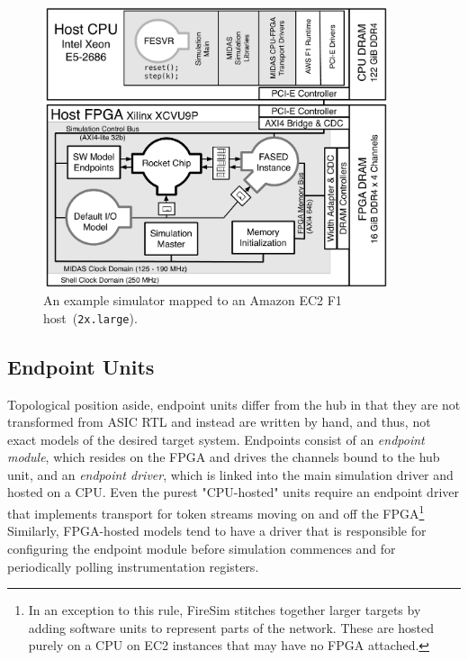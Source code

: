 \begin{figure}
    \centering
    \includegraphics[width=0.9\textwidth]{figures/mapped-simulator-f1.pdf}
    \caption{An example simulator mapped to an Amazon EC2 F1 host~(\texttt{2x.large}).}
    \label{fig:mapped-simulator-f1}
\end{figure}


\subsection{Endpoint Units}

Topological position aside, endpoint units differ from the hub in that they are not transformed from ASIC
RTL and instead are written by hand, and thus, not exact models of the desired target system.
Endpoints consist of an \emph{endpoint module}, which resides on the FPGA and drives the channels bound to the hub unit, and an
\emph{endpoint driver}, which is linked into the main simulation driver and hosted on a CPU.
Even the purest "CPU-hosted" units require an endpoint driver that
implements transport for token streams moving on and off the
FPGA\footnote{In an exception to this rule, FireSim stitches together larger targets by adding software units
to represent parts of the network. These are hosted purely on a CPU on EC2 instances that may have no FPGA attached.}
Similarly, FPGA-hosted models tend to have a driver
that is responsible for configuring the endpoint module before simulation commences and for periodically polling
instrumentation registers.

